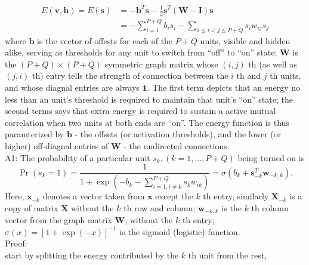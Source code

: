 \documentclass[11pt]{article}
\newcommand{\bs}{\boldsymbol}
\newcommand{\vb}{\boldsymbol{b}}
\newcommand{\vh}{\boldsymbol{h}}
\newcommand{\vv}{\boldsymbol{v}}
\newcommand{\vx}{\boldsymbol{x}}
\newcommand{\vw}{\boldsymbol{w}}
\newcommand{\vs}{\boldsymbol{s}}
\newcommand{\mw}{\boldsymbol{W}}
\newcommand{\mx}{\boldsymbol{X}}
\begin{document}
\begin{equation}\label{eq:e(s)} %
  \begin{split}
    E(\vv, \vh) = E(\vs)
    &= -\vb^T \vs - \frac{1}{2}\vs^T (\mw - \bs{I}) \vs \\
    &= -\sum_{i=1}^{P+Q} b_i s_i - \sum_{1 \le i < j \le P+Q} s_i w_{ij} s_j
  \end{split}
\end{equation}
where $\vb$ is the vector of offests for each of the $P+Q$ units, visible and hidden alike, serving as thresholds for any unit to switch from ``off'' to ``on'' state; $\mw$ is the $(P+Q) \times (P+Q)$ symmetric graph matrix whose $(i,j)$ th (as well as $(j, i)$ th) entry tells the strength of connection between the $i$ th and $j$ th units, and whose diagnal entries are always $\bs{1}$. The first term depicts that an energy no less than an unit's threshold is required to maintain that unit's ``on'' state; the second terms says that extra energy is required to sustain a active mutual correlation when two units at both ends are ``on''. The energy function is thus paramterized by $\vb$ - the offsets (or activation thresholds), and the lower (or higher) off-diagnal entries of $\mw$ - the undirected connections. \\
A1: The probability of a particular unit $s_k, (k = 1, \dots, P+Q)$ being turned on is
\begin{equation}\label{eq:p(s_k=1)}
  \Pr(s_k = 1) = \frac{1}{1 + \exp{(-b_k - \sum_{i=1, i \ne k}^{P+Q}{s_k w_{ik}})}}
  = \sigma(b_k + \vs_{-k}^T \vw_{-k, k}).
\end{equation}
Here, $\vx_{-k}$ denotes a vector taken from $\vx$ except the $k$ th entry, similarly $\mx_{-k}$ is a copy of matrix $\mx$ without the $k$ th row and column; $\vw_{-k,k}$ is the $k$ th column vector from the graph matrix $\mw$, without the $k$ th entry; $\sigma(x) = [1 + \exp({-x})]^{-1}$ is the sigmoid (logistic) function. \\
Proof: \\
start by splitting the energy contributed by the $k$ th unit from the rest,
\newcommand{\st}{\tilde{s}}
\end{document}
